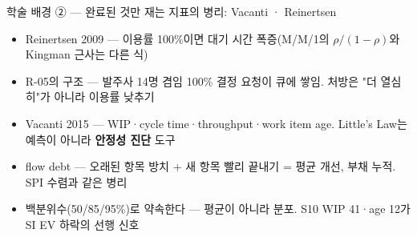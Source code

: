 \begin{frame}{학술 배경 ② — 완료된 것만 재는 지표의 병리: Vacanti · Reinertsen}
\begin{itemize}
\item Reinertsen 2009 — 이용률 \ra{} 100\%이면 대기 시간 폭증(M/M/1의 $\rho/(1-\rho)$와 Kingman 근사는 다른 식)
\item R-05의 구조 — 발주사 14명 겸임 \til{}100\% \ra{} 결정 요청이 큐에 쌓임. 처방은 "더 열심히"가 아니라 이용률 낮추기
\item Vacanti 2015 — WIP·cycle time·throughput·work item age. Little's Law는 예측이 아니라 \textbf{안정성 진단} 도구
\item flow debt — 오래된 항목 방치 + 새 항목 빨리 끝내기 = 평균 개선, 부채 누적. SPI 수렴과 같은 병리
\item 백분위수(50/85/95\%)로 약속한다 — 평균이 아니라 분포. S10 WIP 41·age 12가 SI EV 하락의 선행 신호
\end{itemize}
\end{frame}

